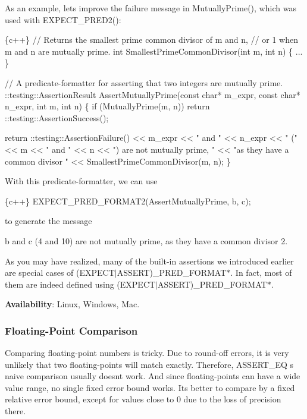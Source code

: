 As an example, let\textquotesingle{}s improve the failure message in {\ttfamily Mutually\+Prime()}, which was used with {\ttfamily E\+X\+P\+E\+C\+T\+\_\+\+P\+R\+E\+D2()}\+:


\begin{DoxyCode}
\{c++\}
// Returns the smallest prime common divisor of m and n,
// or 1 when m and n are mutually prime.
int SmallestPrimeCommonDivisor(int m, int n) \{ ... \}

// A predicate-formatter for asserting that two integers are mutually prime.
::testing::AssertionResult AssertMutuallyPrime(const char* m\_expr,
                                               const char* n\_expr,
                                               int m,
                                               int n) \{
  if (MutuallyPrime(m, n)) return ::testing::AssertionSuccess();

  return ::testing::AssertionFailure() << m\_expr << " and " << n\_expr
      << " (" << m << " and " << n << ") are not mutually prime, "
      << "as they have a common divisor " << SmallestPrimeCommonDivisor(m, n);
\}
\end{DoxyCode}


With this predicate-\/formatter, we can use


\begin{DoxyCode}
\{c++\}
  EXPECT\_PRED\_FORMAT2(AssertMutuallyPrime, b, c);
\end{DoxyCode}


to generate the message


\begin{DoxyCode}
b and c (4 and 10) are not mutually prime, as they have a common divisor 2.
\end{DoxyCode}


As you may have realized, many of the built-\/in assertions we introduced earlier are special cases of {\ttfamily (E\+X\+P\+E\+C\+T$\vert$\+A\+S\+S\+E\+RT)\+\_\+\+P\+R\+E\+D\+\_\+\+F\+O\+R\+M\+A\+T$\ast$}. In fact, most of them are indeed defined using {\ttfamily (E\+X\+P\+E\+C\+T$\vert$\+A\+S\+S\+E\+RT)\+\_\+\+P\+R\+E\+D\+\_\+\+F\+O\+R\+M\+A\+T$\ast$}.

{\bfseries Availability}\+: Linux, Windows, Mac.

\subsubsection*{Floating-\/\+Point Comparison}

Comparing floating-\/point numbers is tricky. Due to round-\/off errors, it is very unlikely that two floating-\/points will match exactly. Therefore, {\ttfamily A\+S\+S\+E\+R\+T\+\_\+\+EQ} \textquotesingle{}s naive comparison usually doesn\textquotesingle{}t work. And since floating-\/points can have a wide value range, no single fixed error bound works. It\textquotesingle{}s better to compare by a fixed relative error bound, except for values close to 0 due to the loss of precision there.

